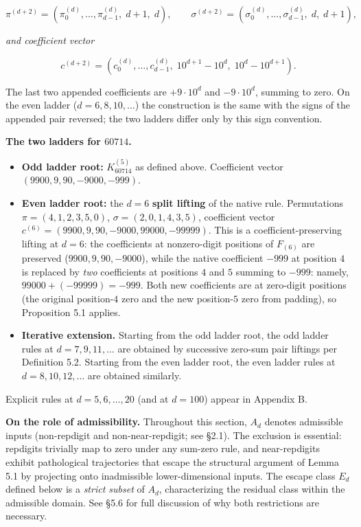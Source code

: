 \documentclass[11pt,letterpaper]{article}
\theoremstyle{paperstyle}
\theoremstyle{paperstyledef}
\theoremstyle{paperstylerem}
\begin{document}
\[\pi^{(d+2)} = (\pi^{(d)}_0, \ldots, \pi^{(d)}_{d-1}, \; d + 1, \; d), \qquad \sigma^{(d+2)} = (\sigma^{(d)}_0, \ldots, \sigma^{(d)}_{d-1}, \; d, \; d + 1),\]

\emph{and coefficient vector}

\[c^{(d+2)} = (c_0^{(d)}, \ldots, c_{d-1}^{(d)}, \; 10^{d+1} - 10^d, \; 10^d - 10^{d+1}).\]

The last two appended coefficients are \(+9 \cdot 10^d\) and
\(-9 \cdot 10^d\), summing to zero. On the even ladder
(\(d = 6, 8, 10, \ldots\)) the construction is the same with the signs
of the appended pair reversed; the two ladders differ only by this sign
convention.

\textbf{The two ladders for \(60714\).}

\begin{itemize}
\item
  \textbf{Odd ladder root:} \(K_{60714}^{(5)}\) as defined above.
  Coefficient vector \((9900, 9, 90, -9000, -999)\).
\item
  \textbf{Even ladder root:} the \(d = 6\) \textbf{split lifting} of the
  native rule. Permutations \(\pi = (4, 1, 2, 3, 5, 0)\),
  \(\sigma = (2, 0, 1, 4, 3, 5)\), coefficient vector
  \(c^{(6)} = (9900, 9, 90, -9000, 99000, -99999)\). This is a
  coefficient-preserving lifting at \(d = 6\): the coefficients at
  nonzero-digit positions of \(F_{(6)}\) are preserved
  (\(9900, 9, 90, -9000\)), while the native coefficient \(-999\) at
  position \(4\) is replaced by \emph{two} coefficients at positions
  \(4\) and \(5\) summing to \(-999\): namely,
  \(99000 + (-99999) = -999\). Both new coefficients are at zero-digit
  positions (the original position-\(4\) zero and the new position-\(5\)
  zero from padding), so Proposition 5.1 applies.
\item
  \textbf{Iterative extension.} Starting from the odd ladder root, the
  odd ladder rules at \(d = 7, 9, 11, \ldots\) are obtained by
  successive zero-sum pair liftings per Definition 5.2. Starting from
  the even ladder root, the even ladder rules at
  \(d = 8, 10, 12, \ldots\) are obtained similarly.
\end{itemize}

Explicit rules at \(d = 5, 6, \ldots, 20\) (and at \(d = 100\)) appear
in Appendix B.

\textbf{On the role of admissibility.} Throughout this section, \(A_d\)
denotes admissible inputs (non-repdigit and non-near-repdigit; see
§2.1). The exclusion is essential: repdigits trivially map to zero under
any sum-zero rule, and near-repdigits exhibit pathological trajectories
that escape the structural argument of Lemma 5.1 by projecting onto
inadmissible lower-dimensional inputs. The escape class \(E_d\) defined
below is a \emph{strict subset} of \(A_d\), characterizing the residual
class within the admissible domain. See §5.6 for full discussion of why
both restrictions are necessary.
\end{document}
